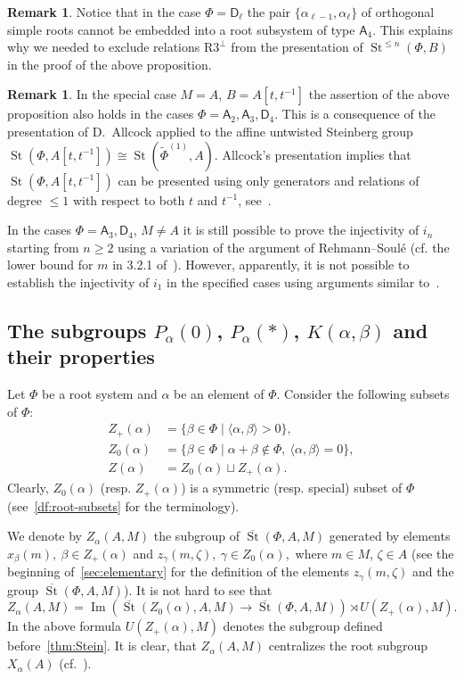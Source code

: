 \documentclass[10pt,a4paper,twoside]{article}
\theoremstyle{remark}
\theoremstyle{definition}
\numberwithin{lemma}{section}
\numberwithin{prop}{section}
\numberwithin{corollary}{section}
\numberwithin{externaltheorem}{section}
\newtheorem{rem}[lemma]{Remark}
\DeclareMathOperator{\Img}{Im}
\DeclareMathOperator{\St}{St}
\newcommand{\inv}{^{-1}}
\newcommand{\rA}{\mathsf{A}}
\newcommand{\rD}{\mathsf{D}}
\numberwithin{equation}{section}
\begin{document}
\begin{rem}
 Notice that in the case $\Phi=\rD_\ell$ the pair $\{\alpha_{\ell-1}, \alpha_{\ell}\}$ of orthogonal simple roots cannot be embedded into a root subsystem of type $\rA_4$. This explains why we needed to exclude relations $\text{R3}^\bot$ from the presentation of $\St^{\leq n}(\Phi, B)$ in the proof of the above proposition.
\end{rem}
\begin{rem}
 In the special case $M=A$, $B = A[t, t\inv]$ the assertion of the above proposition also holds in the cases $\Phi=\rA_2, \rA_3, \rD_4$. This is a consequence of the presentation of D.~Allcock applied to the affine untwisted Steinberg group $\St(\Phi, A[t, t\inv]) \cong \St(\widetilde{\Phi}^{(1)}, A)$. Allcock's presentation implies that $\St(\Phi, A[t, t\inv])$ can be presented using only generators and relations of degree $\leq 1$ with respect to both $t$ and $t^{-1}$, see~\cite[Corollary~1.3]{A13}.
 
 In the cases $\Phi = \rA_3, \rD_4$, $M \neq A$ it is still possible to prove the injectivity of $i_n$ starting from $n\geq 2$ using a variation of the argument of Rehmann--Soul{\'e} (cf. the lower bound for $m$ in 3.2.1 of~\cite{RS76}). However, apparently, it is not possible to establish the injectivity of $i_1$ in the specified cases using arguments similar to~\cite{RS76}.
\end{rem}

\subsection{The subgroups \texorpdfstring{$P_\alpha(0)$}{Pa(0)}, \texorpdfstring{$P_\alpha(*)$}{Pa(*)}, \texorpdfstring{$K(\alpha, \beta)$}{K(a,b)} and their properties} \label{sec:Pa0-basic}
Let $\Phi$ be a root system and $\alpha$ be an element of $\Phi$.
Consider the following subsets of $\Phi$:
\begin{align} Z_+(\alpha) & = \{ \beta \in \Phi \mid \langle \alpha, \beta \rangle > 0 \}, \\
   Z_0(\alpha) & = \{ \beta \in \Phi \mid \alpha + \beta \not\in \Phi,\ \langle \alpha, \beta \rangle = 0 \}, \\
   Z(\alpha)   & = Z_0(\alpha) \sqcup Z_+(\alpha). \end{align}
Clearly, $Z_0(\alpha)$ (resp. $Z_+(\alpha)$) is a symmetric (resp. special) subset of $\Phi$ (see~\cref{df:root-subsets} for the terminology).
   
We denote by $Z_\alpha(A, M)$ the subgroup of $\overline{\St}(\Phi, A, M)$ generated by elements
 $x_{\beta}(m),\ \beta \in Z_+(\alpha)$ and $z_{\gamma}(m, \zeta),\ \gamma \in Z_0(\alpha),$ where $m \in M$, $\zeta \in A$ (see the beginning of~\cref{sec:elementary} for the definition of the elements $z_\gamma(m, \zeta)$ and the group $\overline{\St}(\Phi, A, M)$).
It is not hard to see that \[Z_\alpha(A, M) = \Img\left(\overline{\St}(Z_0(\alpha), A, M) \to \overline{\St}(\Phi, A, M)\right) \rtimes U(Z_+(\alpha), M). \]
In the above formula $U(Z_+(\alpha), M)$ denotes the subgroup defined before~\cref{thm:Stein}.
It is clear, that $Z_\alpha(A, M)$ centralizes the root subgroup $X_\alpha(A)$ (cf.~\cite[984]{St71}).
\end{document}
